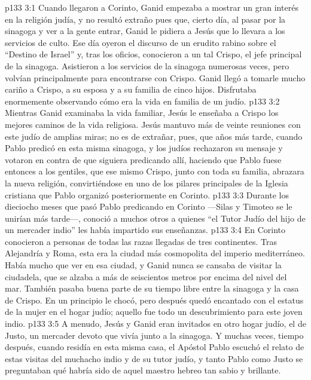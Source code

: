 \vs p133 3:1 Cuando llegaron a Corinto, Ganid empezaba a mostrar un gran interés en la religión judía, y no resultó extraño pues que, cierto día, al pasar por la sinagoga y ver a la gente entrar, Ganid le pidiera a Jesús que lo llevara a los servicios de culto. Ese día oyeron el discurso de un erudito rabino sobre el “Destino de Israel” y, tras los oficios, conocieron a un tal Crispo, el jefe principal de la sinagoga. Asistieron a los servicios de la sinagoga numerosas veces, pero volvían principalmente para encontrarse con Crispo. Ganid llegó a tomarle mucho cariño a Crispo, a su esposa y a su familia de cinco hijos. Disfrutaba enormemente observando cómo era la vida en familia de un judío.
\vs p133 3:2 Mientras Ganid examinaba la vida familiar, Jesús le enseñaba a Crispo los mejores caminos de la vida religiosa. Jesús mantuvo más de veinte reuniones con este judío de amplias miras; no es de extrañar, pues, que años más tarde, cuando Pablo predicó en esta misma sinagoga, y los judíos rechazaron su mensaje y votaron en contra de que siguiera predicando allí, haciendo que Pablo fuese entonces a los gentiles, que ese mismo Crispo, junto con toda su familia, abrazara la nueva religión, convirtiéndose en uno de los pilares principales de la Iglesia cristiana que Pablo organizó posteriormente en Corinto.
\vs p133 3:3 Durante los dieciocho meses que pasó Pablo predicando en Corinto ---Silas y Timoteo se le unirían más tarde---, conoció a muchos otros a quienes “el Tutor Judío del hijo de un mercader indio” les había impartido sus enseñanzas.
\vs p133 3:4 En Corinto conocieron a personas de todas las razas llegadas de tres continentes. Tras Alejandría y Roma, esta era la ciudad más cosmopolita del imperio mediterráneo. Había mucho que ver en esa ciudad, y Ganid nunca se cansaba de visitar la ciudadela, que se alzaba a más de seiscientos metros por encima del nivel del mar. También pasaba buena parte de su tiempo libre entre la sinagoga y la casa de Crispo. En un principio le chocó, pero después quedó encantado con el estatus de la mujer en el hogar judío; aquello fue todo un descubrimiento para este joven indio.
\vs p133 3:5 A menudo, Jesús y Ganid eran invitados en otro hogar judío, el de Justo, un mercader devoto que vivía junto a la sinagoga. Y muchas veces, tiempo después, cuando residía en esta misma casa, el Apóstol Pablo escuchó el relato de estas visitas del muchacho indio y de su tutor judío, y tanto Pablo como Justo se preguntaban qué habría sido de aquel maestro hebreo tan sabio y brillante.
